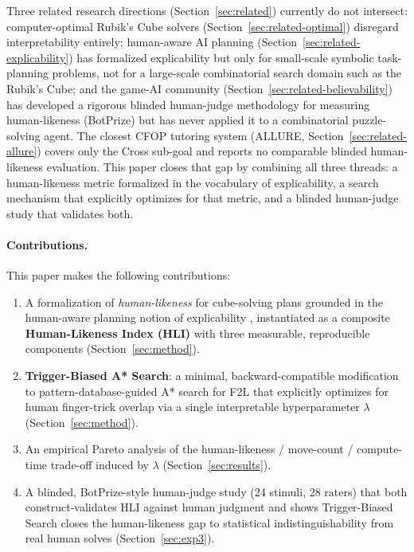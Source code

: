 \documentclass[10pt,conference]{article}
\begin{document}
Three related research directions (Section~\ref{sec:related}) currently
do not intersect: computer-optimal Rubik's Cube solvers
(Section~\ref{sec:related-optimal}) disregard interpretability entirely;
human-aware AI planning (Section~\ref{sec:related-explicability}) has
formalized explicability but only for small-scale symbolic
task-planning problems, not for a large-scale combinatorial search
domain such as the Rubik's Cube; and the game-AI community
(Section~\ref{sec:related-believability}) has developed a rigorous
blinded human-judge methodology for measuring human-likeness
(BotPrize) but has never applied it to a combinatorial puzzle-solving
agent. The closest CFOP tutoring system (ALLURE,
Section~\ref{sec:related-allure}) covers only the Cross sub-goal and
reports no comparable blinded human-likeness evaluation. This paper
closes that gap by combining all three threads: a human-likeness
metric formalized in the vocabulary of explicability, a search
mechanism that explicitly optimizes for that metric, and a blinded
human-judge study that validates both.

\paragraph{Contributions.} This paper makes the following contributions:
\begin{enumerate}
  \item A formalization of \emph{human-likeness} for cube-solving
    plans grounded in the human-aware planning notion of
    explicability \citep{kulkarni2016,chakraborti2019}, instantiated
    as a composite \textbf{Human-Likeness Index (HLI)} with three
    measurable, reproducible components (Section~\ref{sec:method}).
  \item \textbf{Trigger-Biased A* Search}: a minimal, backward-compatible
    modification to pattern-database-guided A* search for F2L that
    explicitly optimizes for human finger-trick overlap via a single
    interpretable hyperparameter $\lambda$ (Section~\ref{sec:method}).
  \item An empirical Pareto analysis of the human-likeness /
    move-count / compute-time trade-off induced by $\lambda$
    (Section~\ref{sec:results}).
  \item A blinded, BotPrize-style \citep{hingston2009} human-judge
    study (24 stimuli, 28 raters) that both construct-validates HLI
    against human judgment and shows Trigger-Biased Search closes
    the human-likeness gap to statistical
    indistinguishability from real human solves
    (Section~\ref{sec:exp3}).
\end{enumerate}
\end{document}
